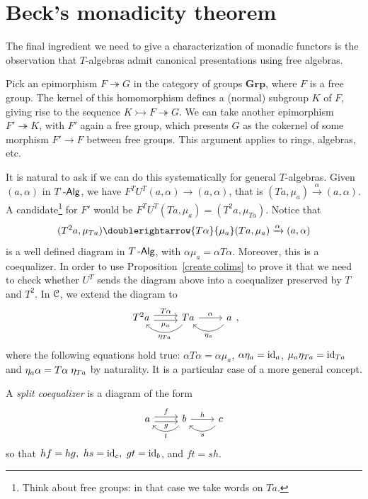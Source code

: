 \documentclass[a4paper,11pt,oneside,openany]{scrbook}
\begin{document}
\section{Beck’s monadicity theorem}

The final ingredient we need to give a characterization of monadic functors is the observation that $T$-algebras admit canonical presentations using free algebras.

\begin{exmp}
	Pick an epimorphism $F\twoheadrightarrow G$ in the category of groups $\mathbf{Grp}$, where $F$ is a free group. The kernel of this homomorphism defines a (normal) subgroup $K$ of $F$, giving rise to the sequence $K\rightarrowtail F\twoheadrightarrow G$. We can take another epimorphism $F'\twoheadrightarrow K$, with $F'$ again a free group, which presents $G$ as the cokernel of some morphism $F'\to F$ between free groups. This argument applies to rings, algebras, etc.
\end{exmp}

It is natural to ask if we can do this systematically for general $T$-algebras. Given $(a,\alpha)$ in $T\operatorname{-\mathsf{Alg}}$, we have $F^TU^T(a,\alpha)\to(a,\alpha)$, that is $(Ta,\mu_a)\xrightarrow{\alpha}(a,\alpha)$. A candidate\footnote{Think about free groups: in that case we take words on $Ta$.} for $F'$ would be $F^TU^T(Ta, \mu_a)=(T^2a, \mu_{Ta})$. Notice that
\[
	(T^2a,\mu_{Ta}) \doublerightarrow{T\alpha}{\mu_a}(Ta,\mu_a)\xrightarrow{\alpha}(a,\alpha)
\]
is a well defined diagram in $T\operatorname{-\mathsf{Alg}}$, with $\alpha\mu_a=\alpha T\alpha$. Moreover, this is a coequalizer. In order to use Proposition~\ref{create colims} to prove it that we need to check whether $U^T$ sends the diagram above into a coequalizer preserved by $T$ and $T^2$. In $\operatorname{\mathcal{C}}$, we extend the diagram to
\[
	\begin{tikzcd}
		T^2a\arrow[r, shift left, "T\alpha"] \arrow[r, shift right, "\mu_a"']
		&Ta  \arrow[r, "\alpha"] \arrow[l, bend left=49, swap, "\eta_{Ta}"'] & a \arrow[l, bend left=49, swap, "\eta_a"']
	\end{tikzcd}
	,\]
where the following equations hold true: $\alpha T\alpha=\alpha\mu_a$, $\alpha\eta_a=\operatorname{id}_a$, $\mu_a\eta_{Ta}=\operatorname{id}_{Ta}$ and $\eta_a\alpha=T\alpha\hspace{1mm}\eta_{Ta}$ by naturality. It is a particular case of a more general concept.
\begin{defn}
	A \emph{split coequalizer} is a diagram of the form
	\vspace*{-2.4mm}
	\[
		\begin{tikzcd}[ampersand replacement=\&]
			a\arrow[r, shift left, "f"] \arrow[r, shift right, "g"']
			\& b \arrow[r, "h"] \arrow[l, bend left=49, "t"] \& c \arrow[l, bend left=49, "s"]
		\end{tikzcd}
	\]
	so that $hf=hg,\ hs=\id_c,\ gt=\id_b$, and $ft=sh$.
\end{defn}
\end{document}
